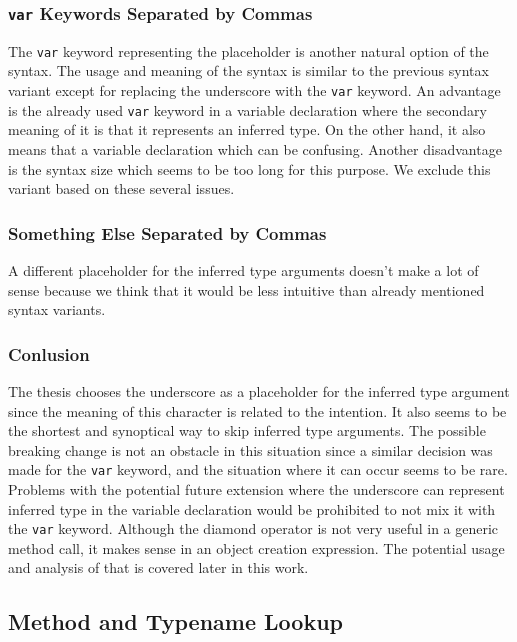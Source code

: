 \subsubsection{\texttt{var} Keywords Separated by Commas} 

The \texttt{var} keyword representing the placeholder is another natural option of the syntax.
The usage and meaning of the syntax is similar to the previous syntax variant except for replacing the underscore with the \texttt{var} keyword.
An advantage is the already used \texttt{var} keyword in a variable declaration where the secondary meaning of it is that it represents an inferred type.
On the other hand, it also means that a variable declaration which can be confusing.
Another disadvantage is the syntax size which seems to be too long for this purpose.
We exclude this variant based on these several issues. 

\subsubsection{Something Else Separated by Commas} 

A different placeholder for the inferred type arguments doesn't make a lot of sense because we think that it would be less intuitive than already mentioned syntax variants.

\subsubsection{Conlusion} 

The thesis chooses the underscore as a placeholder for the inferred type argument since the meaning of this character is related to the intention. 
It also seems to be the shortest and synoptical way to skip inferred type arguments. 
The possible breaking change is not an obstacle in this situation since a similar decision was made for the \texttt{var} keyword, and the situation where it can occur seems to be rare. 
Problems with the potential future extension where the underscore can represent inferred type in the variable declaration would be prohibited to not mix it with the \texttt{var} keyword. 
Although the diamond operator is not very useful in a generic method call, it makes sense in an object creation expression. 
The potential usage and analysis of that is covered later in this work.

\subsection{Method and Typename Lookup}


